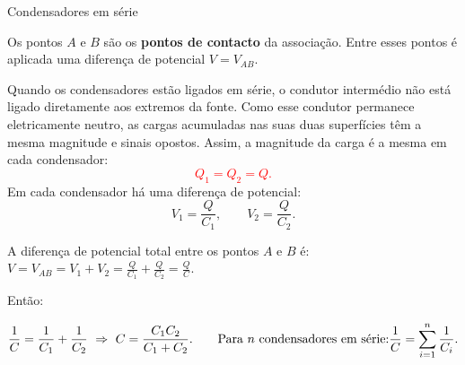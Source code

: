 \documentclass{beamer}
\begin{document}
	\begin{frame}{Condensadores em série}
		\scriptsize
		
		Os pontos \(A\) e \(B\) são os \textbf{pontos de contacto} da associação.
		Entre esses pontos é aplicada uma diferença de potencial \(V=V_{AB}\).
		
		\vspace{0.15cm}
		
		\begin{center}
		\end{center}
		
		{\tiny Quando os condensadores estão ligados em série, o condutor intermédio não está ligado diretamente aos extremos da fonte. Como esse condutor permanece eletricamente neutro, as cargas acumuladas nas suas duas superfícies têm a mesma magnitude e sinais opostos. Assim, a magnitude da carga é a mesma em cada condensador:}
		\textcolor{red}{\[
			Q_1=Q_2=Q.\]
			}
		Em cada condensador há uma diferença de potencial:	
		\[
		V_1=\frac{Q}{C_1},
		\qquad
		V_2=\frac{Q}{C_2}.
		\]
		
		A diferença de potencial total entre os pontos \(A\) e \(B\) é:
		$
		V=V_{AB}=V_1+V_2
		=
		\frac{Q}{C_1}
		+
		\frac{Q}{C_2}
		=
		\frac{Q}{C}.
		$
		
		Então:
		
		\[
		\frac{1}{C}
		=
		\frac{1}{C_1}
		+
		\frac{1}{C_2}
		\,\,
		\Rightarrow
		\,\,
		C=\frac{C_1C_2}{C_1+C_2}.\text{\qquad Para \(n\) condensadores em série:} \frac{1}{C}
			=
			\sum_{i=1}^{n}\frac{1}{C_i}.
		\]
		
		
	
	\end{frame}
	
\end{document}
